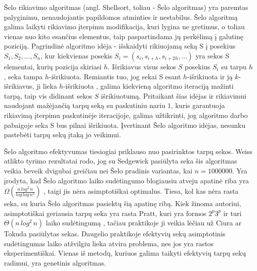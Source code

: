 \documentclass{VUMIFInfKursinis}
\begin{document}
Šelo rikiavimo algoritmas (angl. Shellsort, toliau - Šelo algoritmas) \cite{10.1145/368370.368387} yra paremtas palyginimu, nenaudojantis papildomos atminties ir nestabilus.
Šelo algoritmą galima laikyti rikiavimo įterpimu modifikacija,
kuri lygina ne gretimus, o toliau vienas nuo kito esančius elementus, taip paspartindama jų perkėlimą į galutinę poziciją.
Pagrindinė algoritmo idėja - išskaidyti rikiuojamą seką S į posekius $S_1, S_2, ..., S_n$,
kur kiekvienas posekis $S_i = (s_i, s_{i+h}, s_{i+2h}, ...)$ yra sekos S elementai, kurių pozicija skiriasi $h$.
Išrikiavus visus sekos $S$ posekius $S_i$ su tarpu $h$, seka tampa $h$-išrikiuota.
Remiantis tuo, jog sekai S esant $h$-išrikiuota ir ją $k$-išrikiavus, ji lieka $h$-išrikiuota \cite{GALE1972103},
galima kiekvieną algoritmo iteraciją mažinti tarpą, taip vis didinant sekos $S$ išrikiuotumą.
Pritaikant šias idėjas ir rikiavimui naudojant mažėjančią tarpų seką su paskutiniu nariu $1$,
kuris garantuoja rikiavimą įterpimu paskutinėje iteracijoje,
galima užtikrinti, jog algoritmo darbo pabaigoje seka S bus pilnai išrikiuota.
Įvertinant Šelo algoritmo idėjas, nesunku pastebėti tarpų sekų įtaką jo veikimui.

Šelo algoritmo efektyvumas tiesiogiai priklauso nuo pasirinktos tarpų sekos.
Weiss atlikto tyrimo \cite{weiss1991short} rezultatai rodo, jog su Sedgewick pasiūlyta seka
šis algoritmas veikia beveik dvigubai greičiau nei Šelo pradinis variantas, kai $n = 1000000$.
Yra įrodyta, kad Šelo algoritmo laiko sudėtingumo blogiausiu atveju apatinė riba yra
$\Omega(\frac{n\,log^2\,n}{log\,log\,n^2})$ \cite{267769}, taigi jis nėra asimptotiškai optimalus.
Tiesa, kol kas nėra rasta seka, su kuria Šelo algoritmas pasiektų šią apatinę ribą.
Kiek žinoma autoriui, asimptotiškai geriausia tarpų seka yra rasta Pratt, kuri yra formos
$2^p3^p$ ir turi $\Theta(n\,log^2\,n)$ laiko sudėtingumą \cite{pratt1972shellsort},
tačiau praktikoje ji veikia lėčiau už Ciura \cite{ciura2001best} ar Tokuda \cite{10.5555/645569.659879} pasiūlytas sekas.
Daugelio praktikoje efektyvių sekų asimptotinis sudėtingumas laiko atžvilgiu lieka atvira problema,
nes jos yra rastos eksperimentiškai.
Vienas iš metodų, kuriuos galima taikyti efektyvių tarpų sekų radimui, yra genetinis algoritmas.
\end{document}
